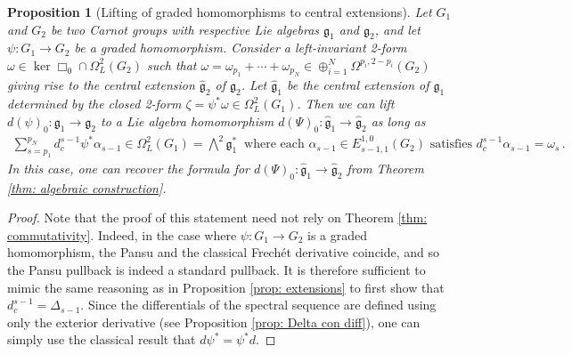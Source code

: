 \documentclass[dvipsnames]{amsart}
\newtheorem{proposition}[theorem]{Proposition}
\theoremstyle{definition}
\theoremstyle{definition}
\numberwithin{equation}{section}
\begin{document}
\begin{proposition}[Lifting of graded homomorphisms to central extensions]\label{prop: Xiangdgong}
    Let $G_1$ and $G_2$ be two Carnot groups with respective Lie algebras $\mathfrak{g}_1$ and $\mathfrak{g}_2$, and let $\psi\colon G_1\to G_2$ be a graded homomorphism. Consider a left-invariant 2-form $\omega\in\ker\Box_0\cap\Omega^2_L(G_2)$ such that $\omega=\omega_{p_1}+\cdots+\omega_{p_N}\in\oplus_{i=1}^N\Omega^{p_i,2-p_i}(G_2)$ giving rise to the central extension $\hat{\mathfrak{g}}_2$ of $\mathfrak{g}_2$. Let $\hat{\mathfrak{g}}_1$ be the central extension of $\mathfrak{g}_1$ determined by the closed 2-form $\zeta=\psi^\ast\omega\in\Omega^2_L(G_1)$. Then we can lift $d(\psi)_0\colon\mathfrak{g}_1\to\mathfrak{g}_2$ to a Lie algebra homomorphism $d(\Psi)_0\colon \hat{\mathfrak{g}}_1\to\hat{\mathfrak{g}}_2$ as long as
    \begin{align*}
        \sum_{s=p_1}^{p_N}d_c^{s-1}\psi^\ast\alpha_{s-1}\in\Omega^2_L(G_1)=\bigwedge\nolimits^2\mathfrak{g}_1^\ast\ \text{ where each }\alpha_{s-1}\in E_{s-1,1}^{1,0}(G_2)\text{ satisfies }d_c^{s-1}\alpha_{s-1}=\omega_s\,.
    \end{align*}
    In this case, one can recover the formula for $d(\Psi)_0\colon\hat{\mathfrak{g}}_1\to\hat{\mathfrak{g}}_2$ from Theorem \ref{thm: algebraic construction}.
\end{proposition}
\begin{proof}
    Note that the proof of this statement need not rely on Theorem \ref{thm: commutativity}. Indeed, in the case where $\psi\colon G_1\to G_2$ is a graded homomorphism, the Pansu and the classical Frech\'et derivative coincide, and so the Pansu pullback is indeed a standard pullback. It is therefore sufficient to mimic the same reasoning as in Proposition \ref{prop: extensions} to first show that $d_c^{s-1}=\Delta_{s-1}$. Since the differentials of the spectral sequence are defined using only the exterior derivative (see Proposition \ref{prop: Delta con diff}), one can simply use the classical result that $d\psi^\ast=\psi^\ast d$.
\end{proof}
\end{document}

